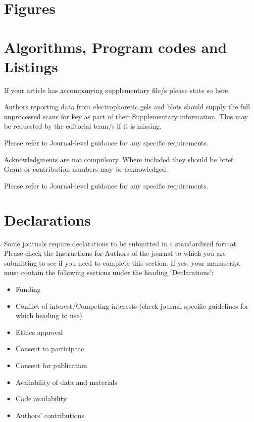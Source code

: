 \documentclass[pdflatex,sn-basic]{sn-jnl}%
\theoremstyle{thmstyleone}%
\theoremstyle{thmstyletwo}%
\theoremstyle{thmstylethree}%
\begin{document}
\section{Figures}\label{sec6}


\section{Algorithms, Program codes and Listings}\label{sec7}






\backmatter


If your article has accompanying supplementary file/s please state so here. 

Authors reporting data from electrophoretic gels and blots should supply the full unprocessed scans for key as part of their Supplementary information. This may be requested by the editorial team/s if it is missing.

Please refer to Journal-level guidance for any specific requirements.


Acknowledgments are not compulsory. Where included they should be brief. Grant or contribution numbers may be acknowledged.

Please refer to Journal-level guidance for any specific requirements.

\section*{Declarations}

Some journals require declarations to be submitted in a standardised format. Please check the Instructions for Authors of the journal to which you are submitting to see if you need to complete this section. If yes, your manuscript must contain the following sections under the heading `Declarations':

\begin{itemize}
\item Funding
\item Conflict of interest/Competing interests (check journal-specific guidelines for which heading to use)
\item Ethics approval 
\item Consent to participate
\item Consent for publication
\item Availability of data and materials
\item Code availability 
\item Authors' contributions
\end{itemize}
\end{document}
